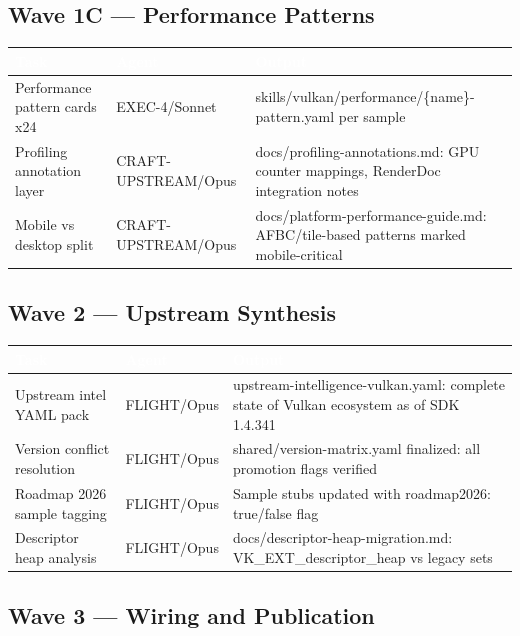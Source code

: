\documentclass[11pt,letterpaper]{article}
\newcommand{\tableheader}[1]{\textbf{\sffamily\textcolor{white}{#1}}}
\begin{document}
\subsection{Wave 1C --- Performance Patterns}

\begin{center}
\begin{tabularx}{\textwidth}{L{3.5cm}L{2cm}X}
\toprule
{}
\tableheader{Task} & \tableheader{Agent} & \tableheader{Output} \\
\midrule
Performance pattern cards x24 & EXEC-4/Sonnet & skills/vulkan/performance/\{name\}-pattern.yaml per sample \\
Profiling annotation layer & CRAFT-UPSTREAM/Opus & docs/profiling-annotations.md: GPU counter mappings, RenderDoc integration notes \\
Mobile vs desktop split & CRAFT-UPSTREAM/Opus & docs/platform-performance-guide.md: AFBC/tile-based patterns marked mobile-critical \\
\bottomrule
\end{tabularx}
\end{center}

\subsection{Wave 2 --- Upstream Synthesis}

\begin{center}
\begin{tabularx}{\textwidth}{L{3.5cm}L{2cm}X}
\toprule
{}
\tableheader{Task} & \tableheader{Agent} & \tableheader{Output} \\
\midrule
Upstream intel YAML pack & FLIGHT/Opus & upstream-intelligence-vulkan.yaml: complete state of Vulkan ecosystem as of SDK 1.4.341 \\
Version conflict resolution & FLIGHT/Opus & shared/version-matrix.yaml finalized: all promotion flags verified \\
Roadmap 2026 sample tagging & FLIGHT/Opus & Sample stubs updated with roadmap2026: true/false flag \\
Descriptor heap analysis & FLIGHT/Opus & docs/descriptor-heap-migration.md: VK\_EXT\_descriptor\_heap vs legacy sets \\
\bottomrule
\end{tabularx}
\end{center}

\subsection{Wave 3 --- Wiring and Publication}
\end{document}
